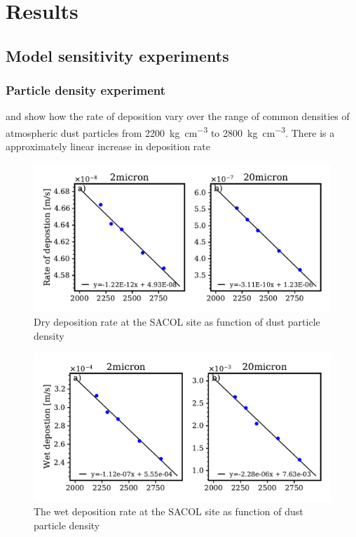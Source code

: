 \chapter{Results}
\section{Model sensitivity experiments}

\subsection{Particle density experiment}
 and  show how the rate of deposition vary over the range of common densities of atmospheric dust particles from \SI{2200}{\kg\per\cubic\cm} to \SI{2800}{\kg\per\cubic\cm}. There is a approximately linear increase in deposition rate   

\begin{figure}[hptb]
    \centering
    \includegraphics[width=\textwidth]{texfiles/figs/drydep_function_of_density.pdf}
    \caption{Dry deposition rate at the SACOL site as function of dust particle density}
    \label{fig:dry_dep_density}
\end{figure}

\begin{figure}[hptb]
    \centering
    \includegraphics[width=\textwidth]{texfiles/figs/wetdep_function_of_density.pdf}
    \caption{The wet deposition rate at the SACOL site as function of dust particle density}
    \label{fig:wet_dep_density}
\end{figure}

